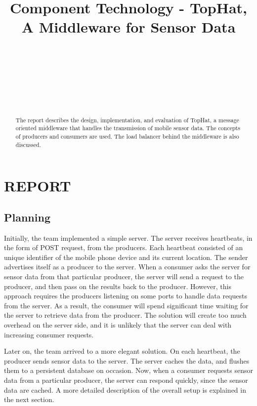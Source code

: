 \documentclass{sigchi}
\begin{document}
\title{Component Technology - TopHat, A Middleware for Sensor Data}

\author{
  \\
    \\
    \\
  \\
    \\
    \\
}

\maketitle

\begin{abstract}
The report describes the design, implementation, and evaluation of TopHat, a message oriented middleware that handles the transmission of mobile sensor data. The concepts of producers and consumers are used. The load balancer behind the middleware is also discussed.
\end{abstract}

\section{REPORT}

\subsection{Planning}

Initially, the team implemented a simple server. The server receives heartbeats, in the form of POST request, from the producers. Each heartbeat consisted of an unique identifier of the mobile phone device and its current location. The sender advertises itself as a producer to the server. When a consumer asks the server for sensor data from that particular producer, the server will send a request to the producer, and then pass on the results back to the producer. However, this approach requires the producers listening on some ports to handle data requests from the server. As a result, the consumer will spend significant time waiting for the server to retrieve data from the producer. The solution will create too much overhead on the server side, and it is unlikely that the server can deal with increasing consumer requests.

Later on, the team arrived to a more elegant solution. On each heartbeat, the producer sends sensor data to the server. The server caches the data, and flushes them to a persistent database on occasion. Now, when a consumer requests sensor data from a particular producer, the server can respond quickly, since the sensor data are cached. A more detailed description of the overall setup is explained in the next section.
\end{document}
